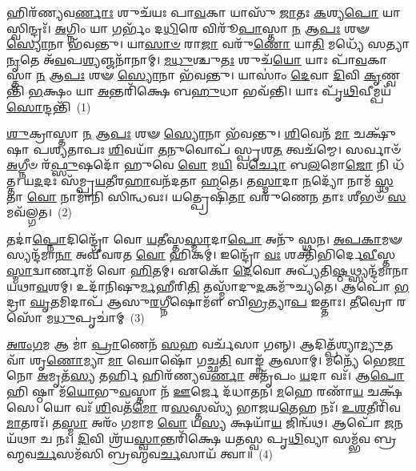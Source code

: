 \setcounter{anuvakam}{0}
𑌹𑌿𑌰᳴𑌣𑍍𑌯𑌵\-\ul{𑌰𑍍𑌣𑌾𑌃} 𑌶𑍁𑌚᳴𑌯𑌃 𑌪𑌾\-\ul{𑌵}\-𑌕𑌾 𑌯𑌾𑌸𑍁᳴ \ul{𑌜𑌾}\-𑌤𑌃 \ul{𑌕}\-𑌶𑍍𑌯\-\ul{𑌪𑍋} 𑌯𑌾𑌸𑍍𑌵𑌿𑌨𑍍𑌦𑍍𑌰𑌃᳴। \ul{𑌅}\-𑌗𑍍𑌨𑌿𑌂 𑌯𑌾 𑌗𑌰𑍍𑌭𑌂᳴ 𑌦\-\ul{𑌧𑌿}\-𑌰𑍇 𑌵𑌿𑌰𑍂᳴\-\ul{𑌪𑌾}\-𑌸𑍍𑌤𑌾 \ul{𑌨} 𑌆\-\ul{𑌪𑌃} 𑌶𑍟 \ul{𑌸𑍍𑌯𑍋}\-𑌨𑌾 𑌭᳴𑌵𑌨𑍍𑌤𑍁। 𑌯𑌾\-\ul{𑌸𑌾}\-\-\ul{𑍞} 𑌰𑌾\-\ul{𑌜𑌾} 𑌵𑌰𑍁᳴\-\ul{𑌣𑍋} 𑌯𑌾\-\ul{𑌤𑌿} 𑌮𑌧𑍍𑌯𑍇᳴ 𑌸𑌤𑍍𑌯𑌾\-\ul{𑌨𑍃}\-𑌤𑍇 𑌅᳴\-\ul{𑌵}\-𑌪\-\ul{𑌶𑍍𑌯}\-𑌞𑍍𑌜𑌨𑌾᳴𑌨𑌾𑌮𑍍। \ul{𑌮}\-\-\ul{𑌧𑍁}\-𑌶𑍍𑌚𑍁\-\ul{𑌤𑌃} 𑌶𑍁𑌚᳴\-\ul{𑌯𑍋} 𑌯𑌾𑌃 𑌪𑌾᳴\-\ul{𑌵}\-𑌕𑌾𑌸𑍍𑌤𑌾 \ul{𑌨} 𑌆\-\ul{𑌪𑌃} 𑌶𑍟 \ul{𑌸𑍍𑌯𑍋}\-𑌨𑌾 𑌭᳴𑌵𑌨𑍍𑌤𑍁। 𑌯𑌾𑌸𑌾𑌂॑ \ul{𑌦𑍇}\-𑌵𑌾 \ul{𑌦𑌿}\-𑌵𑌿 \ul{𑌕𑍃}\-𑌣𑍍𑌵𑌨𑍍𑌤𑌿᳴ \ul{𑌭}\-𑌕𑍍𑌷𑌂 𑌯𑌾 \ul{𑌅}\-𑌨𑍍𑌤𑌰𑌿᳴𑌕𑍍𑌷𑍇 𑌬\-\ul{𑌹𑍁}\-𑌧𑌾 𑌭𑌵᳴𑌨𑍍𑌤𑌿। 𑌯𑌾𑌃 𑌪𑍃᳴\-\ul{𑌥𑌿}\-𑌵𑍀𑌮𑍍𑌪𑌯᳴\-\ul{𑌸𑍋}\-𑌨𑍍𑌦𑌨𑍍𑌤𑌿᳴~(1)

\-\ul{𑌶𑍁}\-𑌕𑍍𑌰𑌾𑌸𑍍𑌤𑌾 \ul{𑌨} 𑌆\-\ul{𑌪𑌃} 𑌶𑍟 \ul{𑌸𑍍𑌯𑍋}\-𑌨𑌾 𑌭᳴𑌵𑌨𑍍𑌤𑍁। \ul{𑌶𑌿}\-𑌵𑍇𑌨᳴ \ul{𑌮𑌾} 𑌚𑌕𑍍𑌷𑍁᳴𑌷𑌾 𑌪𑌶𑍍𑌯𑌤𑌾𑌪𑌃 \ul{𑌶𑌿}\-𑌵𑌯𑌾᳴ \ul{𑌤}\-𑌨𑍁𑌵𑍋𑌪᳴ 𑌸𑍍𑌪𑍃𑌶\-\ul{𑌤} 𑌤𑍍𑌵𑌚᳴𑌮𑍍𑌮𑍇। 𑌸𑌰𑍍𑌵𑌾𑍞᳴ \ul{𑌅}\-𑌗𑍍𑌨𑍀𑍞 𑌰᳴\-\ul{𑌫𑍍𑌸𑍁}\-𑌷𑌦𑍋᳴ 𑌹𑍁𑌵𑍇 \ul{𑌵𑍋} 𑌮\-\ul{𑌯𑌿} 𑌵\-\ul{𑌰𑍍𑌚𑍋} 𑌬\-\ul{𑌲}\-𑌮𑍋\-\ul{𑌜𑍋} 𑌨𑌿 𑌧᳴𑌤𑍍𑌤। 𑌯\-\ul{𑌦}\-𑌦𑌃 𑌸᳴𑌮𑍍𑌪𑍍𑌰\-\ul{𑌯}\-𑌤𑍀𑌰\-\ul{𑌹𑌾}\-𑌵𑌨᳴𑌦𑌤𑌾 \ul{𑌹}\-𑌤𑍇। 𑌤\-\ul{𑌸𑍍𑌮𑌾}\-𑌦𑌾 \ul{𑌨}\-𑌦𑍍𑌯𑍋᳴ 𑌨𑌾𑌮᳴ \ul{𑌸𑍍𑌥} 𑌤𑌾 \ul{𑌵𑍋} 𑌨𑌾𑌮𑌾᳴𑌨𑌿 𑌸𑌿𑌨𑍍𑌧𑌵𑌃। 𑌯𑌤𑍍𑌪𑍍𑌰𑍇𑌷𑌿᳴\-\ul{𑌤𑌾} 𑌵𑌰𑍁᳴𑌣𑍇\-\ul{𑌨} 𑌤𑌾𑌃 𑌶𑍀𑌭𑍞᳴ \ul{𑌸}\-𑌮𑌵᳴𑌲𑍍𑌗𑌤।~(2)

𑌤𑌦𑌾॑\-\ul{𑌪𑍍𑌨𑍋}\-𑌦𑌿𑌨𑍍𑌦𑍍𑌰𑍋᳴ 𑌵𑍋 \ul{𑌯}\-𑌤𑍀𑌸𑍍𑌤\-\ul{𑌸𑍍𑌮𑌾}\-𑌦𑌾\-\ul{𑌪𑍋} 𑌅𑌨𑍁᳴ 𑌸𑍍𑌥𑌨। \ul{𑌅}\-\-\ul{𑌪}\-\-\ul{𑌕𑌾}\-𑌮𑍟 𑌸𑍍𑌯𑌨𑍍𑌦᳴𑌮𑌾\-\ul{𑌨𑌾} 𑌅𑌵𑍀᳴𑌵𑌰𑌤 \ul{𑌵𑍋} 𑌹𑌿𑌕𑌮𑍍॑। 𑌇𑌨𑍍𑌦𑍍𑌰𑍋᳴ \ul{𑌵𑌃} 𑌶𑌕𑍍𑌤𑌿᳴𑌭𑌿𑌰𑍍𑌦𑍇\-\ul{𑌵𑍀}\-𑌸𑍍𑌤\-\ul{𑌸𑍍𑌮𑌾}\-𑌦𑍍𑌵𑌾𑌰𑍍𑌣𑌾𑌮᳴ 𑌵𑍋 \ul{𑌹𑌿}\-𑌤𑌮𑍍। 𑌏𑌕𑍋᳴ \ul{𑌦𑍇}\-𑌵𑍋 𑌅𑌪𑍍𑌯᳴𑌤𑌿\-\ul{𑌷𑍍𑌠}\-𑌥𑍍𑌸𑍍𑌯𑌨𑍍𑌦᳴𑌮𑌾𑌨𑌾 𑌯𑌥𑌾\-\ul{𑌵}\-𑌶𑌮𑍍। 𑌉𑌦𑌾᳴𑌨𑌿𑌷𑍁\-\ul{𑌰𑍍𑌮}\-𑌹𑍀𑌰𑌿\-\ul{𑌤𑌿} 𑌤𑌸𑍍𑌮𑌾᳴𑌦𑍁\-\ul{𑌦}\-𑌕𑌮𑍁᳴𑌚𑍍𑌯𑌤𑍇। 𑌆𑌪𑍋᳴ \ul{𑌭}\-𑌦𑍍𑌰𑌾 \ul{𑌘𑍃}\-𑌤𑌮𑌿𑌦𑌾𑌪᳴ 𑌆𑌸𑍁\-\ul{𑌰}\-𑌗𑍍𑌨𑍀𑌷𑍋𑌮𑍗᳴ 𑌬𑌿\-\ul{𑌭𑍍𑌰}\-𑌤𑍍𑌯𑌾\-\ul{𑌪} 𑌇𑌤𑍍𑌤𑌾𑌃। \ul{𑌤𑍀}\-𑌵𑍍𑌰𑍋 𑌰𑌸𑍋᳴ 𑌮\-\ul{𑌧𑍁}\-𑌪𑍃𑌚𑌾॑𑌮𑍍~(3)

\-\ul{𑌅}\-\-\ul{𑌰𑌂}\-\-\ul{𑌗}\-𑌮 𑌆 𑌮𑌾॑ \ul{𑌪𑍍𑌰𑌾}\-𑌣𑍇𑌨᳴ \ul{𑌸}\-𑌹 𑌵𑌰𑍍𑌚᳴𑌸𑌾 𑌗𑌨𑍍𑌨𑍍। 𑌆𑌦𑌿𑌤𑍍𑌪᳴𑌶𑍍𑌯𑌾\-\ul{𑌮𑍍𑌯𑍁}\-𑌤 𑌵𑌾᳴ 𑌶𑍃\-\ul{𑌣𑍋}\-𑌮𑍍𑌯𑌾 \ul{𑌮𑌾} 𑌘𑍋𑌷𑍋᳴ 𑌗𑌚𑍍𑌛\-\ul{𑌤𑌿} 𑌵𑌾𑌙𑍍𑌨᳴ 𑌆𑌸𑌾𑌮𑍍। 𑌮𑌨𑍍𑌯𑍇᳴ 𑌭𑍇\-\ul{𑌜𑌾}\-𑌨𑍋 \ul{𑌅}\-𑌮𑍃𑌤᳴\-\ul{𑌸𑍍𑌯} 𑌤𑌰𑍍\mbox{}\-\ul{𑌹𑌿} 𑌹𑌿𑌰᳴𑌣𑍍𑌯𑌵\-\ul{𑌰𑍍𑌣𑌾} 𑌅𑌤𑍃᳴𑌪𑌂 \ul{𑌯}\-𑌦𑌾 𑌵𑌃᳴। 𑌆\-\ul{𑌪𑍋} 𑌹𑌿 𑌷𑍍𑌠𑌾 𑌮᳴\-\ul{𑌯𑍋}\-𑌭𑍁\-\ul{𑌵}\-𑌸𑍍𑌤𑌾 𑌨᳴ \ul{𑌊}\-𑌰𑍍𑌜𑍇 𑌦᳴𑌧𑌾𑌤𑌨। \ul{𑌮}\-𑌹𑍇 𑌰𑌣𑌾᳴\-\ul{𑌯} 𑌚𑌕𑍍𑌷᳴𑌸𑍇। 𑌯𑍋 𑌵𑌃᳴ \ul{𑌶𑌿}\-𑌵𑌤᳴\-\ul{𑌮𑍋} 𑌰\-\ul{𑌸}\-𑌸𑍍𑌤𑌸𑍍𑌯᳴ 𑌭𑌾𑌜𑌯\-\ul{𑌤𑍇}\-𑌹 𑌨𑌃᳴। \ul{𑌉}\-\-\ul{𑌶}\-𑌤𑍀𑌰𑌿᳴𑌵 \ul{𑌮𑌾}\-𑌤𑌰𑌃᳴। 𑌤\-\ul{𑌸𑍍𑌮𑌾} 𑌅𑌰𑌂᳴ 𑌗𑌮𑌾𑌮 \ul{𑌵𑍋} 𑌯\-\ul{𑌸𑍍𑌯} 𑌕𑍍𑌷𑌯𑌾᳴\-\ul{𑌯} 𑌜𑌿𑌨𑍍𑌵᳴𑌥। 𑌆𑌪𑍋᳴ \ul{𑌜}\-𑌨𑌯᳴𑌥𑌾 𑌚 𑌨𑌃। \ul{𑌦𑌿}\-𑌵𑌿 𑌶𑍍𑌰᳴𑌯\-\ul{𑌸𑍍𑌵𑌾}\-𑌨𑍍𑌤𑌰𑌿᳴𑌕𑍍𑌷𑍇 𑌯𑌤𑌸𑍍𑌵 𑌪𑍃\-\ul{𑌥𑌿}\-𑌵𑍍𑌯𑌾 𑌸𑌮𑍍𑌭᳴𑌵 𑌬𑍍𑌰𑌹𑍍𑌮𑌵\-\ul{𑌰𑍍𑌚}\-𑌸𑌮᳴𑌸𑌿 𑌬𑍍𑌰𑌹𑍍𑌮𑌵\-\ul{𑌰𑍍𑌚}\-𑌸𑌾𑌯᳴ 𑌤𑍍𑌵𑌾॥~(4)

